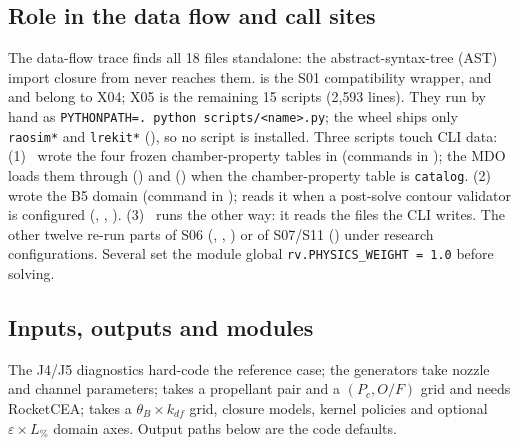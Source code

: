 \subsection{Role in the data flow and call sites}
The data-flow trace finds all 18  files standalone: the abstract-syntax-tree (AST) import closure from  never reaches them.  is the S01 compatibility wrapper, and  and  belong to X04; X05 is the remaining 15 scripts (2{,}593 lines). They run by hand as \texttt{PYTHONPATH=. python scripts/<name>.py}; the wheel ships only \texttt{raosim*} and \texttt{lrekit*} (), so no script is installed. Three scripts touch CLI data:
(1)~ wrote the four frozen chamber-property tables in  (commands in ); the MDO loads them through  () and  () when the chamber-property table is \texttt{catalog}. (2)~ wrote the B5 domain  (command in );  reads it when a post-solve contour validator is configured (, , ). (3)~ runs the other way: it reads the  files the CLI writes. The other twelve re-run parts of S06 (, , ) or of S07/S11 () under research configurations. Several set the module global \texttt{rv.PHYSICS\_WEIGHT = 1.0} before solving.

\subsection{Inputs, outputs and modules}
The J4/J5 diagnostics hard-code the reference case; the generators take nozzle and channel parameters;  takes a propellant pair and a $(P_c,O/F)$ grid and needs RocketCEA;  takes a $\theta_B\times k_{df}$ grid, closure models, kernel policies and optional $\varepsilon\times L_\%$ domain axes. Output paths below are the code defaults.

